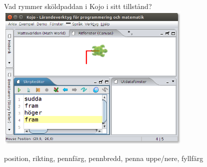 



\begin{Slide}{Vad rymmer sköldpaddan i Kojo i sitt tillstånd?}
\centering
\includegraphics[width=0.7\textwidth]{../img/kojo}

\pause position, rikting, pennfärg, pennbredd, penna uppe/nere, fyllfärg
\end{Slide}



